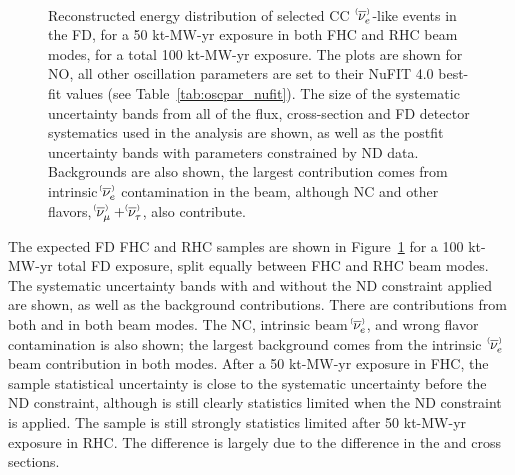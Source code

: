 \begin{figure}[htbp]
 \\
 \caption{Reconstructed energy distribution of selected CC $\;\nue^{\bracketbar}$-like events in the FD, for a 50 kt-MW-yr exposure in both FHC and RHC beam modes, for a total 100 kt-MW-yr exposure. The plots are shown for NO, all other oscillation parameters are set to their NuFIT 4.0 best-fit values (see Table~\ref{tab:oscpar_nufit}). The size of the systematic uncertainty bands from all of the flux, cross-section and FD detector systematics used in the analysis are shown, as well as the postfit uncertainty bands with parameters constrained by ND data. Backgrounds are also shown, the largest contribution comes from intrinsic $\nue^{\bracketbar}$ contamination in the beam, although NC and other flavors, $\numu^{\bracketbar} + \nutau^{\bracketbar}$, also contribute.}
 \label{fig:appspectra}
\end{figure}
The expected FD FHC \nue and RHC \anue samples are shown in Figure~\ref{fig:appspectra} for a 100 kt-MW-yr total FD exposure, split equally between FHC and RHC beam modes. The systematic uncertainty bands with and without the ND constraint applied are shown, as well as the background contributions. There are contributions from both \nue and \anue in both beam modes. The NC, intrinsic beam $\nue^{\bracketbar}$, and wrong flavor contamination is also shown; the largest background comes from the intrinsic $\;\nue^{\bracketbar}$ beam contribution in both modes. After a 50 kt-MW-yr exposure in FHC, the \nue sample statistical uncertainty is close to the systematic uncertainty before the ND constraint, although is still clearly statistics limited when the ND constraint is applied. The \anue sample is still strongly statistics limited after 50 kt-MW-yr exposure in RHC. The difference is largely due to the difference in the \nue and \anue cross sections. %

